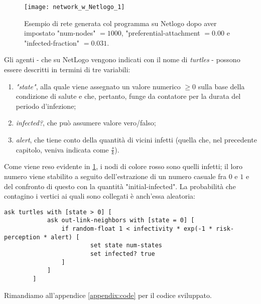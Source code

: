 \begin{figure}[t]
		\begin{center}
			\texttt{[image: network\_w\_Netlogo\_1]}
			\caption{Esempio di rete generata col programma su Netlogo dopo aver impostato "num-nodes" $= 1000 $, "preferential-attachment $= 0.00 $ e "infected-fraction" $= 0.031 $.}
			\label{fig:NetLogo1}
		\end{center}
\end{figure}
Gli agenti - che su NetLogo vengono indicati con il nome di \emph{turtles} - possono essere descritti in termini di tre variabili:
\begin{enumerate}
\item \textit{"state"}, alla quale viene assegnato un valore numerico $ \geq 0 $ sulla base della condizione di salute e che, pertanto, funge da contatore per la durata del periodo d'infezione;
\item \textit{infected?}, che può assumere valore vero/falso;
\item \textit{alert}, che tiene conto della quantità di vicini infetti (quella che, nel precedente capitolo, veniva indicata come $ \tfrac{s}{k}$).
\end{enumerate}
Come viene reso evidente in \cref{fig:NetLogo1}, i nodi di colore rosso sono quelli infetti; il loro numero viene stabilito a seguito dell'estrazione di un numero casuale fra $ 0 $ e $ 1 $ e del confronto di questo con la quantità "initial-infected". La probabilità che contagino i vertici ai quali sono collegati è anch'essa aleatoria:
\begin{center}
	\begin{lstlisting}[language={NetLogo},caption={Porzione di codice in cui si mette in luce il meccanismo di infezione},label={list:infection_prob}]
		ask turtles with [state > 0] [
    		ask out-link-neighbors with [state = 0] [
      			if random-float 1 < infectivity * exp(-1 * risk-perception * alert) [
        				set state num-states
        				set infected? true
      			]
    		]
  		]
	\end{lstlisting}
\end{center}
Rimandiamo all'appendice \ref{appendix:code} per il codice sviluppato.


	
	